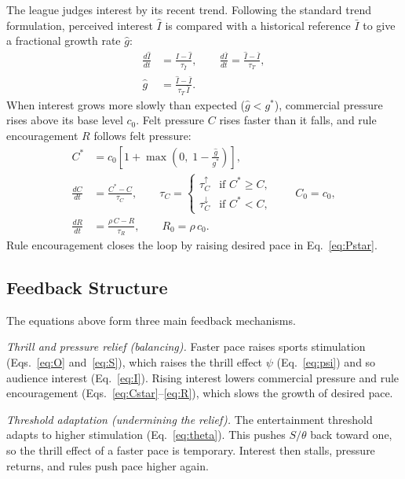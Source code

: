 The league judges interest by its recent trend. Following the standard
trend formulation, perceived interest $\hat{I}$ is compared with a
historical reference $\bar{I}$ to give a fractional growth rate
$\hat{g}$:
\begin{align}
  \frac{d\hat{I}}{dt} &= \frac{I - \hat{I}}{\tau_{\hat{I}}},
  \qquad
  \frac{d\bar{I}}{dt} = \frac{\hat{I} - \bar{I}}{\tau_T},
  \label{eq:Itrend}\\[4pt]
  \hat{g} &= \frac{\hat{I} - \bar{I}}{\tau_T\, \bar{I}} .
  \label{eq:ghat}
\end{align}
When interest grows more slowly than expected ($\hat{g} < g^{*}$),
commercial pressure rises above its base level $c_0$. Felt pressure
$C$ rises faster than it falls, and rule encouragement $R$ follows
felt pressure:
\begin{align}
  C^{*} &= c_0 \left[ 1 + \max\!\left( 0,\; 1 - \frac{\hat{g}}{g^{*}} \right) \right],
  \label{eq:Cstar}\\[4pt]
  \frac{dC}{dt} &= \frac{C^{*} - C}{\tau_C},
  \qquad
  \tau_C =
  \begin{cases}
    \tau_C^{\uparrow} & \text{if } C^{*} \ge C,\\
    \tau_C^{\downarrow} & \text{if } C^{*} < C,
  \end{cases}
  \qquad C_0 = c_0,
  \label{eq:C}\\[4pt]
  \frac{dR}{dt} &= \frac{\rho\, C - R}{\tau_R},
  \qquad R_0 = \rho\, c_0 .
  \label{eq:R}
\end{align}
Rule encouragement closes the loop by raising desired pace in
Eq.~\eqref{eq:Pstar}.

\subsection{Feedback Structure}
\label{sec:model:feedback}

The equations above form three main feedback mechanisms.

\textit{Thrill and pressure relief (balancing).} Faster pace raises
sports stimulation (Eqs.~\ref{eq:O} and~\ref{eq:S}), which raises the
thrill effect $\psi$ (Eq.~\ref{eq:psi}) and so audience interest
(Eq.~\ref{eq:I}). Rising interest lowers commercial pressure and rule
encouragement (Eqs.~\ref{eq:Cstar}--\ref{eq:R}), which slows the
growth of desired pace.

\textit{Threshold adaptation (undermining the relief).} The
entertainment threshold adapts to higher stimulation
(Eq.~\ref{eq:theta}). This pushes $S/\theta$ back toward one, so the
thrill effect of a faster pace is temporary. Interest then stalls,
pressure returns, and rules push pace higher again.

